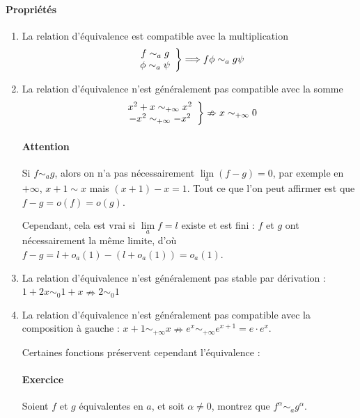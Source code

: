 \documentclass[]{article}
\begin{document}
\paragraph{Propriétés}
\begin{enumerate}
	\item La relation d'équivalence est compatible avec la multiplication
	$$\left. \begin{array}{c c}
		f \sim_a g \\
		\phi \sim_a \psi \\
	\end{array} \right\} \Longrightarrow f \phi \sim_a g \psi$$
	
	\item La relation d'équivalence n'est généralement pas compatible avec la somme
	$$\left. \begin{array}{c c}
			x^2 + x\sim_{+\infty} x^2 \\
			-x^2 \sim_{+\infty} -x^2 \\
		\end{array} \right\} \nRightarrow x \sim_{+\infty} 0$$
	
	\paragraph{Attention}
	 Si $f \sim_a g$, alors on n'a pas nécessairement  $\lim\limits_{a} (f-g) = 0$, par exemple en $+\infty$, $x+1 \sim x$ mais $(x+1)-x=1$. Tout ce que l'on peut affirmer est que $f-g=o(f)=o(g)$.
	 
	 Cependant, cela est vrai si $\displaystyle \lim\limits_{a} f = l$ existe et est fini : $f$ et $g$ ont nécessairement la même limite, d'où $f-g=l+o_a(1)-(l+o_a(1))=o_a(1)$.
	
	\item La relation d'équivalence n'est généralement pas stable par dérivation : $1+2x \sim_0 1+x \nRightarrow 2 \sim_0 1$
	
	\item La relation d'équivalence n'est généralement pas compatible avec la composition à gauche : $x+1 \sim_{+\infty} x \nRightarrow e^x \sim_{+\infty} e^{x+1}=e\cdot e^x$.
	
	Certaines fonctions préservent cependant l'équivalence :
	\paragraph{Exercice}
	Soient $f$ et $g$ équivalentes en $a$, et soit $\alpha \ne 0$, montrez que $f^\alpha \sim_a g^\alpha$.
	

\end{enumerate}
\end{document}
